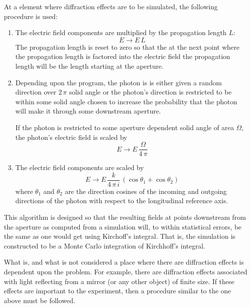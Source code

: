 At a  element where diffraction effects are to
be simulated, the following procedure is used:
  \begin{enumerate}
  \item
The electric field components are multiplied by the propagation length $L$:
\begin{equation}
  E \rightarrow E \, L
\end{equation}
The propagation length is reset to zero so that the at the next point
where the propagation length is factored into the electric field the
propagation length will be the length starting at the aperture.
  \item
Depending upon the program, the photon is is either given a random
direction over $2 \, \pi$ solid angle or the photon's direction
is restricted to be within some solid angle chosen to increase
the probability that the photon will make it through some downstream aperture.

If the photon is restricted to some aperture dependent solid angle of area $\Omega$,
the photon's electric field is scaled by
\begin{equation}
  E \rightarrow E \, \frac{\Omega}{4 \, \pi}
  \label{eeo4p}
\end{equation}

  \item
The electric field components are scaled by
\begin{equation}
  E \rightarrow E \, \frac{k}{4 \, \pi \, i} \, (\cos\theta_1 + \cos\theta_2)
  \label{eek4p}
\end{equation}
where $\theta_1$ and $\theta_2$ are the direction cosines of the
incoming and outgoing directions of the photon with respect to the
longitudinal reference axis.
  \end{enumerate}
This algorithm is designed so that the resulting fields at points
downstream from the aperture as computed from a simulation will, to
within statistical errors, be the same as one would get using
Kirchoff's integral. That is, the simulation is constructed to be a
Monte Carlo integration of Kirchhoff's integral.

What is, and what is not considered a place where there are
diffraction effects is dependent upon the problem. For example, there
are diffraction effects associated with light reflecting from a mirror
(or any other object) of finite size. If these effects are important
to the experiment, then a procedure similar to the one above must be
followed. 

